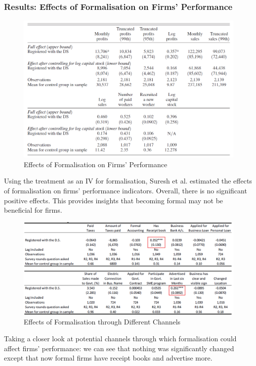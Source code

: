         \subsubsection{Results: Effects of Formalisation on Firms' Performance}
            \begin{figure}[H]
                \centering
                \includegraphics[width=5.5in]{images/ch5/SL formal treatment 3.png}
                \caption{Effects of Formalisation on Firms' Performance}
            \end{figure}
            Using the treatment as an IV for formalisation, Suresh et al. estimated the effects of formalisation on firms' performance indicators. Overall, there is no significant positive effects. This provides insights that becoming formal may not be beneficial for firms.
            \begin{figure}[H]
                \centering
                \includegraphics[width=5.5in]{images/ch5/SL formal treatment 4.png}
                \caption{Effects of Formalisation through Different Channels}
            \end{figure}
            Taking a closer look at potential channels through which formalisation could affect firms' performance: we can see that nothing was significantly changed except that now formal firms have receipt books and advertise more.
        
